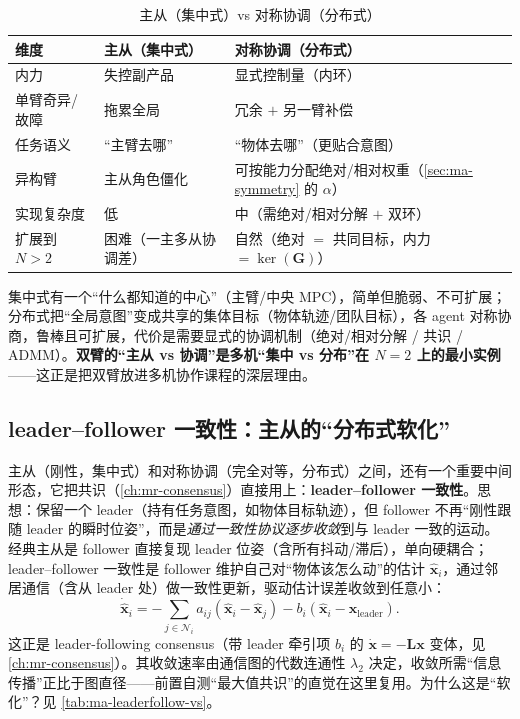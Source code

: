 \begin{table}[H]\centering\small
\caption{主从（集中式）vs 对称协调（分布式）}
\label{tab:ma-coord-vs}
\begin{tabular}{lll}
\toprule
维度 & 主从（集中式） & 对称协调（分布式） \\
\midrule
内力 & 失控副产品 & 显式控制量（内环） \\
单臂奇异/故障 & 拖累全局 & 冗余 $+$ 另一臂补偿 \\
任务语义 & “主臂去哪” & “物体去哪”（更贴合意图） \\
异构臂 & 主从角色僵化 & 可按能力分配绝对/相对权重（\cref{sec:ma-symmetry} 的 $\alpha$） \\
实现复杂度 & 低 & 中（需绝对/相对分解 $+$ 双环） \\
扩展到 $N>2$ & 困难（一主多从协调差） & 自然（绝对 $=$ 共同目标，内力 $=\ker(\mathbf{G})$） \\
\bottomrule
\end{tabular}
\end{table}

\begin{insight}
集中式有一个“什么都知道的中心”（主臂/中央 MPC），简单但脆弱、不可扩展；分布式把“全局意图”变成共享的集体目标（物体轨迹/团队目标），各 agent 对称协商，鲁棒且可扩展，代价是需要显式的协调机制（绝对/相对分解 / 共识 / ADMM）。\textbf{双臂的“主从 vs 协调”是多机“集中 vs 分布”在 $N=2$ 上的最小实例}——这正是把双臂放进多机协作课程的深层理由。
\end{insight}

\subsection{leader--follower 一致性：主从的“分布式软化”}
\label{sec:ma-leaderfollower}

主从（刚性，集中式）和对称协调（完全对等，分布式）之间，还有一个重要中间形态，它把共识（\cref{ch:mr-consensus}）直接用上：\textbf{leader--follower 一致性}。思想：保留一个 leader（持有任务意图，如物体目标轨迹），但 follower 不再“刚性跟随 leader 的瞬时位姿”，而是\emph{通过一致性协议逐步收敛}到与 leader 一致的运动。经典主从是 follower 直接复现 leader 位姿（含所有抖动/滞后），单向硬耦合；leader--follower 一致性是 follower 维护自己对“物体该怎么动”的估计 $\hat{\mathbf{x}}_i$，通过邻居通信（含从 leader 处）做一致性更新，驱动估计误差收敛到任意小：
\begin{equation}
  \dot{\hat{\mathbf{x}}}_i=-\sum_{j\in\mathcal{N}_i}a_{ij}(\hat{\mathbf{x}}_i-\hat{\mathbf{x}}_j)-b_i(\hat{\mathbf{x}}_i-\mathbf{x}_{\text{leader}}).
  \label{eq:ma-leaderfollow}
\end{equation}
这正是 leader-following consensus（带 leader 牵引项 $b_i$ 的 $\dot{\mathbf{x}}=-\mathbf{L}\mathbf{x}$ 变体，见 \cref{ch:mr-consensus}）。其收敛速率由通信图的代数连通性 $\lambda_2$ 决定，收敛所需“信息传播”正比于图直径——前置自测“最大值共识”的直觉在这里复用。为什么这是“软化”？见 \cref{tab:ma-leaderfollow-vs}。

